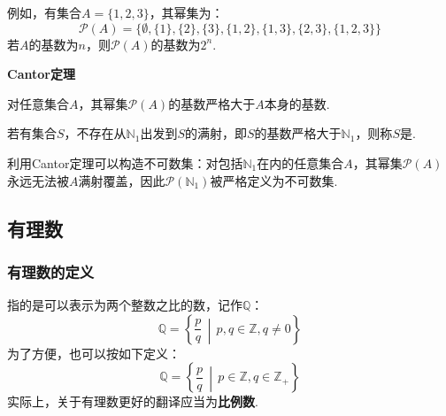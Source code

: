 例如，有集合$A = \{1,2,3\}$，其幂集为：
\[\mathcal{P}(A) = \{\emptyset, \{1\}, \{2\}, \{3\}, \{1,2\}, \{1,3\}, \{2,3\}, \{1,2,3\}\}\]
若$A$的基数为$n$，则$\mathcal{P}(A)$的基数为$2^n$.

\begin{theorem}
    \textbf{Cantor定理}

    对任意集合$A$，其幂集$\mathcal{P}(A)$的基数严格大于$A$本身的基数.
\end{theorem}

\begin{definition}
    若有集合$S$，不存在从$\mathbb{N}_1$出发到$S$的满射，即$S$的基数严格大于$\mathbb{N}_1$，则称$S$是.
\end{definition}

利用Cantor定理可以构造不可数集：对包括$\mathbb{N}_1$在内的任意集合$A$，其幂集$\mathcal{P}(A)$永远无法被$A$满射覆盖，因此$\mathcal{P}(\mathbb{N}_1)$被严格定义为不可数集.


\subsection{有理数}
\subsubsection{有理数的定义}
\begin{definition}
    指的是可以表示为两个整数之比的数，记作$\mathbb{Q}$：
    \[\mathbb{Q} = \left\{ \frac{p}{q} \,\middle|\, p,q \in \mathbb{Z}, q \neq 0 \right\}\]
    为了方便，也可以按如下定义：
    \[\mathbb{Q} = \left\{ \frac{p}{q} \,\middle|\, p \in \mathbb{Z}, q \in \mathbb{Z}_+\right\}\]
    实际上，关于有理数更好的翻译应当为\textbf{比例数}.
\end{definition}

